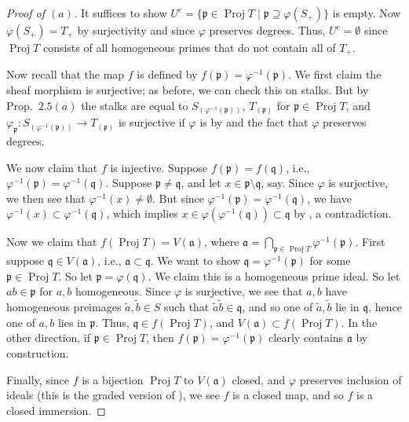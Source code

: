 \documentclass[10pt]{article}
\theoremstyle{definition}
\theoremstyle{remark}
\numberwithin{equation}{section}
\numberwithin{figure}{subsubsection}
\DeclareMathOperator{\Proj}{Proj}
\begin{document}
\begin{proof}[Proof of $(a)$]
  It suffices to show $U^c = \{\mathfrak{p} \in \Proj T \mid \mathfrak{p}
  \supseteq \varphi(S_+)\}$ is empty. Now $\varphi(S_+) = T_+$ by surjectivity and
  since $\varphi$ preserves degrees. Thus, $U^c = \emptyset$ since $\Proj T$
  consists of all homogeneous primes that do not contain all of $T_+$.
  \par Now recall that the map $f$ is defined by $f(\mathfrak{p}) =
  \varphi^{-1}(\mathfrak{p})$. We first claim the sheaf morphism is surjective;
  as before, we can check this on stalks. But by Prop.~$2.5(a)$ the stalks are
  equal to $S_{(\varphi^{-1}(\mathfrak{p}))}$, $T_{(\mathfrak{p})}$ for
  $\mathfrak{p} \in \Proj T$, and $\varphi_{\mathfrak{p}}\colon
  S_{(\varphi^{-1}(\mathfrak{p}))} \to T_{(\mathfrak{p})}$ is surjective if
  $\varphi$ is by \cite[Prop.~3.9]{AM69} and the fact that $\varphi$ preserves
  degrees.
  \par We now claim that $f$ is injective. Suppose $f(\mathfrak{p}) =
  f(\mathfrak{q})$, i.e., $\varphi^{-1}(\mathfrak{p}) =
  \varphi^{-1}(\mathfrak{q})$. Suppose $\mathfrak{p} \ne \mathfrak{q}$, and let
  $x \in \mathfrak{p} \setminus \mathfrak{q}$, say. Since $\varphi$ is
  surjective, we then see that $\varphi^{-1}(x) \ne \emptyset$. But since
  $\varphi^{-1}(\mathfrak{p}) = \varphi^{-1}(\mathfrak{q})$, we have
  $\varphi^{-1}(x) \subset \varphi^{-1}(\mathfrak{q})$, which implies $x \in \varphi(\varphi^{-1}(\mathfrak{q})) \subset \mathfrak{q}$ by \cite[Prop.~1.17i]{AM69}, a contradiction. 
  \par Now we claim that $f(\Proj T) = V(\mathfrak{a})$, where $\mathfrak{a} = \bigcap_{\mathfrak{p} \in \Proj T} \varphi^{-1}(\mathfrak{p})$. First suppose $\mathfrak{q} \in V(\mathfrak{a})$, i.e., $\mathfrak{a} \subset \mathfrak{q}$. We want to show $\mathfrak{q} = \varphi^{-1}(\mathfrak{p})$ for some $\mathfrak{p} \in \Proj T$. So let $\mathfrak{p} = \varphi(\mathfrak{q})$. We claim this is a homogeneous prime ideal. So let $ab \in \mathfrak{p}$ for $a,b$ homogeneous. Since $\varphi$ is surjective, we see that $a,b$ have homogeneous preimages $\tilde{a},\tilde{b} \in S$ such that $\tilde{a}\tilde{b} \in \mathfrak{q}$, and so one of $\tilde{a},\tilde{b}$ lie in $\mathfrak{q}$, hence one of $a,b$ lies in $\mathfrak{p}$. Thus, $\mathfrak{q} \in f(\Proj T)$, and $V(\mathfrak{a}) \subset f(\Proj T)$. In the other direction, if $\mathfrak{p} \in \Proj T$, then $f(\mathfrak{p}) = \varphi^{-1}(\mathfrak{p})$ clearly contains $\mathfrak{a}$ by construction.
  \par Finally, since $f$ is a bijection $\Proj T$ to $V(\mathfrak{a})$ closed,
  and $\varphi$ preserves inclusion of ideals (this is the graded version of
  \cite[Exc.\ 1.21$iv$]{AM69}), we see $f$ is a closed
  map, and so $f$ is a closed immersion.
\end{proof}
\end{document}
